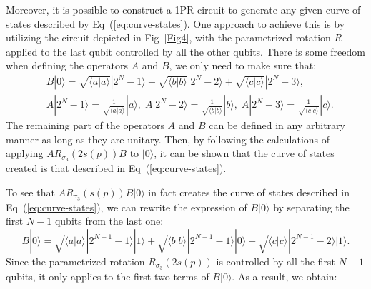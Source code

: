\documentclass[10pt,letterpaper]{article} %
\newcommand{\fref}[1]{Fig~\ref{#1}}
\newcommand{\eref}[1]{Eq~(\ref{#1})}
\begin{document}
Moreover, it is possible to construct a 1PR circuit to generate any given curve of 
states described by \eref{eq:curve-states}. 
One approach to achieve this is by utilizing the circuit 
depicted in \fref{Fig4}, 
with the parametrized rotation $R$ applied to the last qubit controlled by all the 
other qubits. There is some freedom when defining
the operators $A$ and $B$, we only need
to make sure that:  
\begin{align}
&B|0\rangle = \sqrt{\langle a | a \rangle} |2^{N}-1 \rangle + \sqrt{\langle b | b \rangle} |2^{N}-2\rangle + \sqrt{\langle c |c \rangle} |2^N-3\rangle, \nonumber \\
&A|2^N-1 \rangle = \frac{1}{\sqrt{\langle a | a \rangle}} |a\rangle,\; A|2^{N}-2\rangle = \frac{1}{\sqrt{\langle b | b \rangle}}|b\rangle, \; A|2^{N}-3\rangle = \frac{1}{\sqrt{\langle c | c \rangle}}|c\rangle.
\label{eq:BA}
\end{align}
The remaining part of the operators $A$ and $B$ can be defined
in any arbitrary manner as long as they are unitary. 
Then, by following the calculations of applying 
$A R_{\sigma_3}(2s(p)) B$ to $|0\rangle$,
it can be shown that the curve of states created is that described in \eref{eq:curve-states}.

To see that $A R_{\sigma_3}(s(p)) B |0\rangle$ in fact creates
the curve of states described in \eref{eq:curve-states},   we can rewrite the expression of $B|0\rangle$ by 
separating the first $N-1$ qubits from the last one:
$$B|0\rangle = \sqrt{\langle a | a \rangle} |2^{N-1}-1\rangle |1\rangle + \sqrt{\langle b | b \rangle} |2^{N-1}-1\rangle |0\rangle + \sqrt{\langle c | c \rangle} |2^{N-1}-2\rangle |1\rangle.$$
Since the parametrized rotation $R_{\sigma_3}(2s(p))$ is controlled by all the first $N-1$ qubits, it only applies to the first two terms of $B|0\rangle$. As a result, we obtain:  
\end{document}
